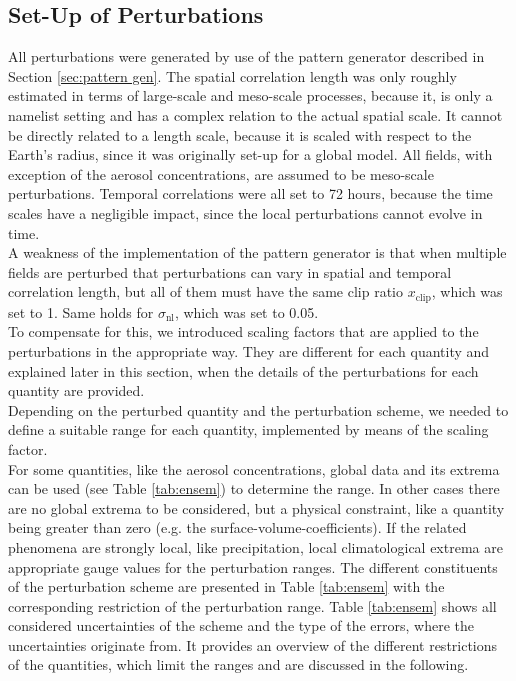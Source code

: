
\subsection{Set-Up of Perturbations}
All perturbations were generated by use of the pattern generator described in Section \ref{sec:pattern gen}. The spatial correlation length was only roughly estimated in terms of large-scale and meso-scale processes, because it, is only a namelist setting and has a complex relation to the actual spatial scale. It cannot be directly related to a length scale, because it is scaled with respect to the Earth's radius, since it was originally set-up for a global model. All fields, with exception of the aerosol concentrations, are assumed to be meso-scale perturbations. Temporal correlations were all set to 72 hours, because the time scales have a negligible impact, since the local perturbations cannot evolve in time.\\
A weakness of the implementation of the pattern generator is that when multiple fields are perturbed that perturbations can vary in spatial and temporal correlation length, but all of them must have the same clip ratio $x_{\mathrm{clip}}$, which was set to 1. Same holds for $\sigma_{\mathrm{nl}}$, which was set to 0.05.\\
To compensate for this, we introduced scaling factors that are applied to the perturbations in the appropriate way. They are different for each quantity and explained later in this section, when the details of the perturbations for each quantity are provided.\\
Depending on the perturbed quantity and the perturbation scheme, we needed to define a suitable range for each quantity, implemented by means of the scaling factor.\\
For some quantities, like the aerosol concentrations, global data and its extrema can be used (see Table \ref{tab:ensem}) to determine the range.
In other cases there are no global extrema to be considered, but a physical constraint, like a quantity being greater than zero (e.g. the surface-volume-coefficients). If the related phenomena are strongly local, like precipitation, local climatological extrema are appropriate gauge values for the perturbation ranges.
The different constituents of the perturbation scheme are presented in Table \ref{tab:ensem} with the corresponding restriction of the perturbation range.
Table \ref{tab:ensem} shows all considered uncertainties of the scheme and the type of the errors, where the uncertainties originate from. It provides an overview of the different restrictions of the quantities, which limit the ranges and are discussed in the following.

